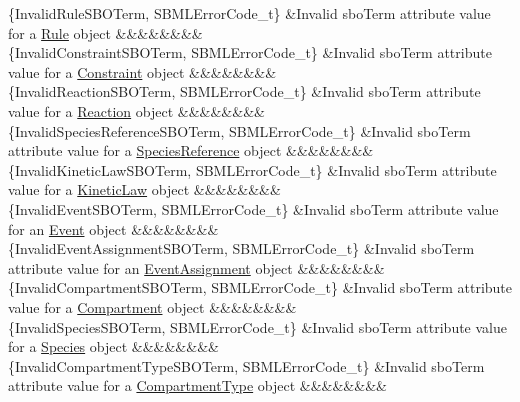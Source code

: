 \begin{DoxyParagraph}{}
\begin{longtabu}
\{Invalid\+Rule\+S\+B\+O\+Term, S\+B\+M\+L\+Error\+Code\+\_\+t\} &Invalid \textquotesingle{}sbo\+Term\textquotesingle{} attribute value for a \hyperlink{class_rule}{Rule} object &&&&&&&&\\
\{Invalid\+Constraint\+S\+B\+O\+Term, S\+B\+M\+L\+Error\+Code\+\_\+t\} &Invalid \textquotesingle{}sbo\+Term\textquotesingle{} attribute value for a \hyperlink{class_constraint}{Constraint} object &&&&&&&&\\
\{Invalid\+Reaction\+S\+B\+O\+Term, S\+B\+M\+L\+Error\+Code\+\_\+t\} &Invalid \textquotesingle{}sbo\+Term\textquotesingle{} attribute value for a \hyperlink{class_reaction}{Reaction} object &&&&&&&&\\
\{Invalid\+Species\+Reference\+S\+B\+O\+Term, S\+B\+M\+L\+Error\+Code\+\_\+t\} &Invalid \textquotesingle{}sbo\+Term\textquotesingle{} attribute value for a \hyperlink{class_species_reference}{Species\+Reference} object &&&&&&&&\\
\{Invalid\+Kinetic\+Law\+S\+B\+O\+Term, S\+B\+M\+L\+Error\+Code\+\_\+t\} &Invalid \textquotesingle{}sbo\+Term\textquotesingle{} attribute value for a \hyperlink{class_kinetic_law}{Kinetic\+Law} object &&&&&&&&\\
\{Invalid\+Event\+S\+B\+O\+Term, S\+B\+M\+L\+Error\+Code\+\_\+t\} &Invalid \textquotesingle{}sbo\+Term\textquotesingle{} attribute value for an \hyperlink{class_event}{Event} object &&&&&&&&\\
\{Invalid\+Event\+Assignment\+S\+B\+O\+Term, S\+B\+M\+L\+Error\+Code\+\_\+t\} &Invalid \textquotesingle{}sbo\+Term\textquotesingle{} attribute value for an \hyperlink{class_event_assignment}{Event\+Assignment} object &&&&&&&&\\
\{Invalid\+Compartment\+S\+B\+O\+Term, S\+B\+M\+L\+Error\+Code\+\_\+t\} &Invalid \textquotesingle{}sbo\+Term\textquotesingle{} attribute value for a \hyperlink{class_compartment}{Compartment} object &&&&&&&&\\
\{Invalid\+Species\+S\+B\+O\+Term, S\+B\+M\+L\+Error\+Code\+\_\+t\} &Invalid \textquotesingle{}sbo\+Term\textquotesingle{} attribute value for a \hyperlink{class_species}{Species} object &&&&&&&&\\
\{Invalid\+Compartment\+Type\+S\+B\+O\+Term, S\+B\+M\+L\+Error\+Code\+\_\+t\} &Invalid \textquotesingle{}sbo\+Term\textquotesingle{} attribute value for a \hyperlink{class_compartment_type}{Compartment\+Type} object &&&&&&&&\\

\end{longtabu}
\end{DoxyParagraph}
